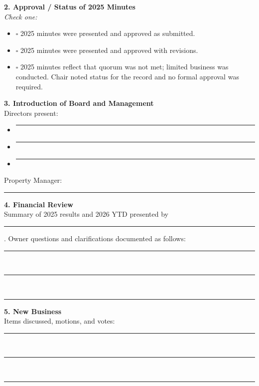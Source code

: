 \documentclass[11pt]{article}
\newcommand{\strong}[1]{\textbf{#1}}
\begin{document}
\vspace{1em}

\noindent
\strong{2. Approval / Status of 2025 Minutes}\\[0.5em]
\emph{Check one:}
\begin{itemize}[leftmargin=1.1em]
    \item \(\square\) 2025 minutes were presented and approved as submitted.
    \item \(\square\) 2025 minutes were presented and approved with revisions.
    \item \(\square\) 2025 minutes reflect that quorum was not met; limited business was
    conducted. Chair noted status for the record and no formal approval was required.
\end{itemize}

\vspace{1em}

\noindent
\strong{3. Introduction of Board and Management}\\[0.5em]
Directors present:
\begin{itemize}[leftmargin=1.1em]
    \item \rule{3in}{0.4pt}
    \item \rule{3in}{0.4pt}
    \item \rule{3in}{0.4pt}
\end{itemize}
Property Manager: \rule{3in}{0.4pt}

\vspace{1em}

\noindent
\strong{4. Financial Review}\\[0.5em]
Summary of 2025 results and 2026 YTD presented by \rule{2.5in}{0.4pt}. Owner questions
and clarifications documented as follows:

\vspace{0.5em}
\rule{6in}{0.4pt}\\[0.5em]
\rule{6in}{0.4pt}\\[0.5em]
\rule{6in}{0.4pt}

\vspace{1em}

\noindent
\strong{5. New Business}\\[0.5em]
Items discussed, motions, and votes:

\vspace{0.5em}
\rule{6in}{0.4pt}\\[0.5em]
\rule{6in}{0.4pt}\\[0.5em]
\rule{6in}{0.4pt}

\vspace{1em}
\end{document}
